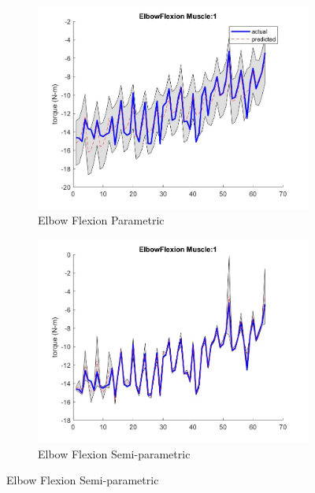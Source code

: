 \begin{figure}[htbp]
    \begin{subfigure}[b]{0.45\linewidth}
        \includegraphics[height=0.15\textheight]{Pictures/Results/GPR/ElbowFlexion_1Parametric.jpg}
        \caption{Elbow Flexion Parametric}
    \end{subfigure}
    \hfill
    \begin{subfigure}[b]{0.45\linewidth}
        \includegraphics[height=0.15\textheight]{Pictures/Results/GPR/ElbowFlexion_1Semiparametric.jpg}
        \caption{Elbow Flexion Semi-parametric}
    \end{subfigure}
    

\end{figure}
